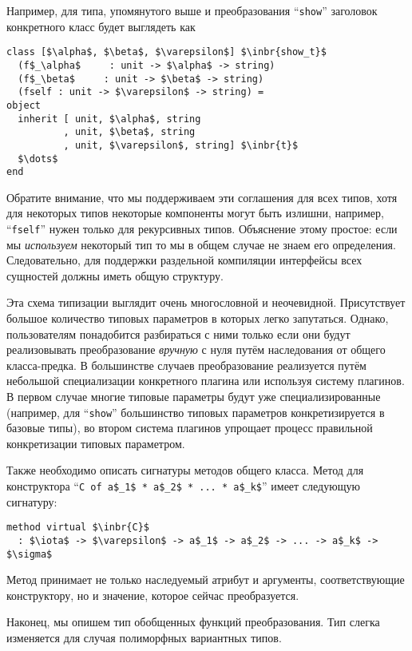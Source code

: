 Например, для типа, упомянутого выше и преобразования ``\lstinline{show}'' заголовок конкретного класс будет выглядеть как

\begin{lstlisting}
class [$\alpha$, $\beta$, $\varepsilon$] $\inbr{show_t}$ 
  (f$_\alpha$     : unit -> $\alpha$ -> string)
  (f$_\beta$     : unit -> $\beta$ -> string)
  (fself : unit -> $\varepsilon$ -> string) =
object 
  inherit [ unit, $\alpha$, string
          , unit, $\beta$, string
          , unit, $\varepsilon$, string] $\inbr{t}$
  $\dots$
end 
\end{lstlisting}

Обратите внимание, что мы поддерживаем эти соглашения для всех типов, хотя для некоторых типов некоторые компоненты могут быть излишни, например, ``\lstinline{fself}''
нужен только для рекурсивных типов. Объяснение этому простое: если мы \emph{используем} некоторый тип
то мы в общем случае не знаем его определения. Следовательно, для поддержки раздельной компиляции интерфейсы всех сущностей должны иметь общую структуру.

Эта схема типизации выглядит очень многословной и неочевидной. Присутствует большое количество типовых параметров в которых легко запутаться.
Однако, пользователям понадобится разбираться с ними только если они будут реализовывать преобразование \emph{вручную} с нуля путём 
наследования от общего класса-предка.
В большинстве случаев преобразование реализуется путём небольшой специализации конкретного плагина или используя систему плагинов. 
В первом случае многие типовые параметры будут уже специализированные (например, для  ``\lstinline{show}'' большинство типовых параметров конкретизируется в базовые типы), во втором система плагинов упрощает процесс правильной конкретизации типовых параметром. %

Также необходимо описать сигнатуры методов общего класса. Метод для конструктора  ``\lstinline|C of a$_1$ * a$_2$ * ... * a$_k$|'' имеет следующую сигнатуру:

\begin{lstlisting}
method virtual $\inbr{C}$ 
  : $\iota$ -> $\varepsilon$ -> a$_1$ -> a$_2$ -> ... -> a$_k$ -> $\sigma$
\end{lstlisting}

\noindent Метод принимает не только наследуемый атрибут и аргументы, соответствующие конструктору, но и значение, которое сейчас преобразуется.

Наконец, мы опишем тип обобщенных функций преобразования. Тип слегка изменяется для случая полиморфных вариантных типов.

